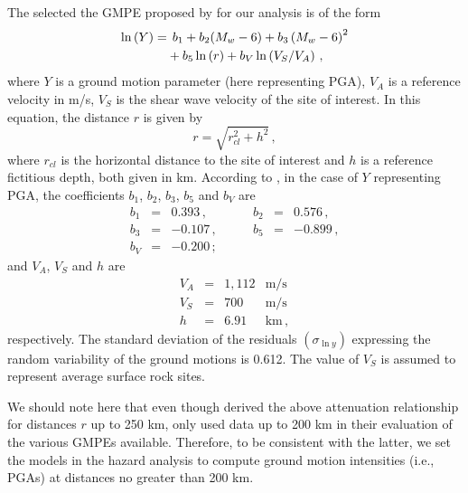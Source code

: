 The selected the GMPE proposed by \citet{Kalkan2004} for our analysis is of the form
%
\begin{align}
	\ln \left( Y \right) =
		& \hspace{1ex} b_1 + b_2(M_w - 6) + b_3 \left( M_w - 6 \right)^{2} \nonumber \\
		& + b_5 \ln \left( r \right) + b_V \ln \left( V_S / V_A \right)
	\, ,
\end{align}
%
where $Y$ is a ground motion parameter (here representing PGA), $V_A$ is a reference velocity in m/s,  $V_S$ is the shear wave velocity of the site of interest. In this equation, the distance $r$ is given by
%
\begin{equation}
	r= \sqrt{ r^2_{\mathit{cl}} + h^2 }
	\, ,
\end{equation}
%
where $r_{\mathit{cl}}$ is the horizontal distance to the site of interest and $h$ is a reference fictitious depth, both given in km. According to \citet{Kalkan2004}, in the case of $Y$ representing PGA, the coefficients $b_1$, $b_2$, $b_3$, $b_5$ and $b_V$ are
%
\begin{equation}
\begin{array}{lcrlcr}
	b_1 &=&  0.393   \,,&\hspace{2em}   b_2 &=& 0.576\,,   \\
	b_3 &=& -0.107   \,,&\hspace{2em}   b_5 &=& -0.899\,,  \\
	b_V &=& -0.200   \,;
	\nonumber
\end{array}
\end{equation}
%
and $V_A$, $V_S$ and $h$ are
%
\begin{equation}
\begin{array}{lcrl}
	V_A &=& 1,112 & \mathrm{m/s}	\\
	V_S &=&   700 & \mathrm{m/s}	\\
	h   &=&  6.91 & \mathrm{km}\,,
	\nonumber
\end{array}
\end{equation}
%
respectively. The standard deviation of the residuals $(\sigma_{\ln y})$ expressing the random variability of the ground motions is 0.612. The value of $V_S$ is assumed to represent average surface rock sites.

We should note here that even though \citet{Kalkan2004} derived the above attenuation relationship for distances $r$ up to 250 km, \citet{Zafarani2014} only used data up to 200 km in their evaluation of the various GMPEs available. Therefore, to be consistent with the latter, we set the models in the hazard analysis to compute ground motion intensities (i.e., PGAs) at distances no greater than 200 km.


